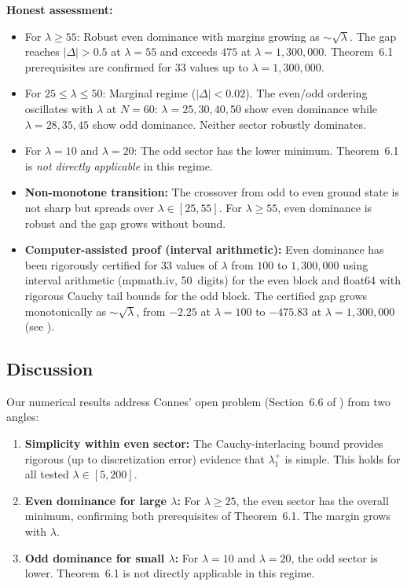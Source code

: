 \documentclass[12pt,a4paper]{article}
\theoremstyle{definition}
\theoremstyle{remark}
\begin{document}
\medskip\noindent
\textbf{Honest assessment:}
\begin{itemize}
  \item For $\lambda \geq 55$: Robust even dominance with margins growing as $\sim\!\sqrt{\lambda}$. The gap reaches $|\Delta| > 0.5$ at $\lambda = 55$ and exceeds $475$ at $\lambda = 1{,}300{,}000$. Theorem~6.1 prerequisites are confirmed for $33$ values up to $\lambda = 1{,}300{,}000$.
  \item For $25 \leq \lambda \leq 50$: Marginal regime ($|\Delta| < 0.02$). The even/odd ordering oscillates with $\lambda$ at $N = 60$: $\lambda = 25, 30, 40, 50$ show even dominance while $\lambda = 28, 35, 45$ show odd dominance. Neither sector robustly dominates.
  \item For $\lambda = 10$ and $\lambda = 20$: The odd sector has the lower minimum. Theorem~6.1 is \emph{not directly applicable} in this regime.
  \item \textbf{Non-monotone transition:} The crossover from odd to even ground state is not sharp but spreads over $\lambda \in [25, 55]$. For $\lambda \geq 55$, even dominance is robust and the gap grows without bound.
  \item \textbf{Computer-assisted proof (interval arithmetic):} Even dominance has been rigorously certified for $33$ values of $\lambda$ from $100$ to $1{,}300{,}000$ using interval arithmetic (mpmath.iv, 50~digits) for the even block and float64 with rigorous Cauchy tail bounds for the odd block. The certified gap grows monotonically as $\sim\!\sqrt{\lambda}$, from $-2.25$ at $\lambda = 100$ to $-475.83$ at $\lambda = 1{,}300{,}000$ (see ).
\end{itemize}

\subsection{Discussion}

Our numerical results address Connes' open problem (Section~6.6 of \cite{Connes2025}) from two angles:
\begin{enumerate}
  \item \textbf{Simplicity within even sector:} The Cauchy-interlacing bound provides rigorous (up to discretization error) evidence that $\lambda_1^+$ is simple. This holds for all tested $\lambda \in [5, 200]$.
  \item \textbf{Even dominance for large $\lambda$:} For $\lambda \geq 25$, the even sector has the overall minimum, confirming both prerequisites of Theorem~6.1. The margin grows with $\lambda$.
  \item \textbf{Odd dominance for small $\lambda$:} For $\lambda = 10$ and $\lambda = 20$, the odd sector is lower. Theorem~6.1 is not directly applicable in this regime.
\end{enumerate}
\end{document}
